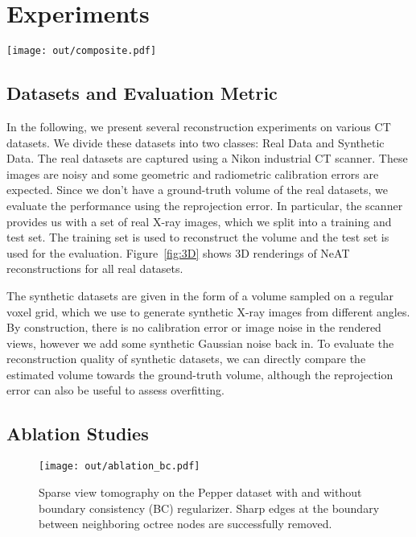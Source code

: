 \documentclass[acmtog,nonacm]{acmart} \acmSubmissionID{0438}
\newcommand{\neat}{NeAT\xspace}
\begin{document}
 \section{Experiments}



\begin{figure*}
\texttt{[image: out/composite.pdf]}
  \caption{
  3D volume renderings of the real datasets, as reconstructed
  by NeRF and \neat using 25-50 projections. From left to right: ceramic coral, pepper, pomegranate, wind-up teapot. See Figure \ref{fig:real_recons} for a 2D slice comparison. }
  \label{fig:3D}
\end{figure*}

\subsection{Datasets and Evaluation Metric}
In the following, we present several reconstruction experiments on various CT datasets.
We divide these datasets into two classes: Real Data and Synthetic Data.
The real datasets are captured using a Nikon industrial CT scanner.
These images are noisy and some geometric and radiometric calibration errors are expected.
Since we don't have a ground-truth volume of the real datasets, we evaluate the performance using the reprojection error. 
In particular, the scanner provides us with a set of real X-ray images, which we split into a training and test set.
The training set is used to reconstruct the volume and the test set is used for the evaluation.
Figure~\ref{fig:3D} shows 3D renderings of \neat reconstructions for
all real datasets.


The synthetic datasets are given in the form of a volume sampled on a
regular voxel grid, which we use to generate synthetic X-ray images
from different angles.  By construction, there is no calibration error
or image noise in the rendered views, however we add some synthetic
Gaussian noise back in.  To evaluate the reconstruction quality of
synthetic datasets, we can directly compare the estimated volume
towards the ground-truth volume, although the reprojection error can
also be useful to assess overfitting.

\subsection{Ablation Studies}

\begin{figure}
\texttt{[image: out/ablation\_bc.pdf]}
	\caption{
		Sparse view tomography on the Pepper dataset with and without boundary consistency (BC) regularizer.
		Sharp edges at the boundary between neighboring octree nodes are successfully removed.
	}
	\label{fig:bc_reg}
\end{figure}
\end{document}
